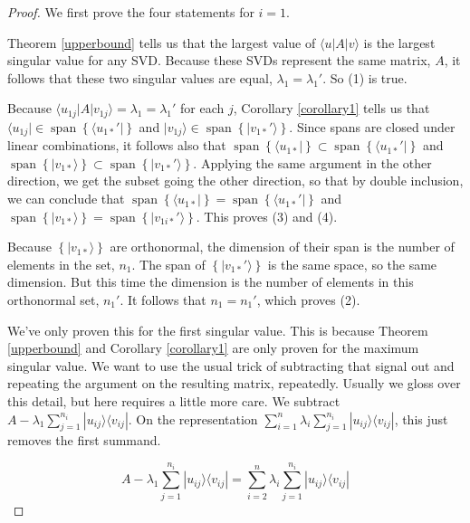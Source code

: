 \documentclass{amsbook}
\begin{document}
\begin{proof}

We first prove the four statements for $i=1$.

Theorem \ref{upperbound} tells us that the largest value of $\langle u|A|v\rangle$ is the largest singular value for any SVD.  Because these SVDs represent the same matrix, $A$, it follows that these two singular values are equal, $\lambda_1=\lambda_1'$.  So (1) is true.

Because $\langle u_{1j}|A|v_{1j}\rangle=\lambda_1=\lambda_1'$ for each $j$, Corollary \ref{corollary1} tells us that $\langle u_{1j}|\in\operatorname{span}\left\{\langle u_{1*}'|\right\}$ and $|v_{1j}\rangle\in\operatorname{span}\left\{|v_{1*}'\rangle\right\}$.  Since spans are closed under linear combinations, it follows also that $\operatorname{span}\left\{\langle u_{1*}|\right\}\subset\operatorname{span}\left\{\langle u_{1*}'|\right\}$ and $\operatorname{span}\left\{|v_{1*}\rangle\right\}\subset\operatorname{span}\left\{|v_{1*}'\rangle\right\}$.  Applying the same argument in the other direction, we get the subset going the other direction, so that by double inclusion, we can conclude that $\operatorname{span}\left\{\langle u_{1*}|\right\}=\operatorname{span}\left\{\langle u_{1*}'|\right\}$ and $\operatorname{span}\left\{|v_{1*}\rangle\right\}=\operatorname{span}\left\{|v_{1i*}'\rangle\right\}$.  This proves (3) and (4).

Because $\left\{|v_{1*}\rangle\right\}$ are orthonormal, the dimension of their span is the number of elements in the set, $n_1$.  The span of $\left\{|v_{1*}'\rangle\right\}$ is the same space, so the same dimension.  But this time the dimension is the number of elements in this orthonormal set, $n_1'$.  It follows that $n_1=n_1'$, which proves (2).

We've only proven this for the first singular value.  This is because Theorem \ref{upperbound} and Corollary \ref{corollary1} are only proven for the maximum singular value.  We want to use the usual trick of subtracting that signal out and repeating the argument on the resulting matrix, repeatedly.  Usually we gloss over this detail, but here requires a little more care.  We subtract $A-\lambda_1\sum_{j=1}^{n_i}|u_{ij}\rangle\langle v_{ij}|$.  On the representation $\sum_{i=1}^n\lambda_i\sum_{j=1}^{n_i}|u_{ij}\rangle\langle v_{ij}|$, this just removes the first summand.

$$
A-\lambda_1\sum_{j=1}^{n_i}|u_{ij}\rangle\langle v_{ij}|=\sum_{i=2}^n\lambda_i\sum_{j=1}^{n_i}|u_{ij}\rangle\langle v_{ij}|
$$


\end{proof}
\end{document}
